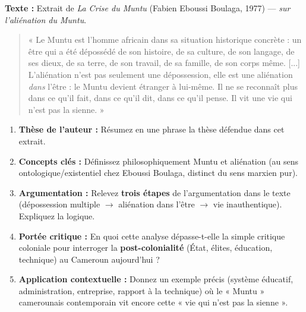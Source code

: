 \documentclass[11pt]{article}
\newcommand{\cle}[1]{{\popxbold\color{popdark}#1}}
\begin{document}
\begin{exercice}
\textbf{Texte :} Extrait de \emph{La Crise du Muntu} (Fabien Eboussi Boulaga, 1977) — \emph{sur l'aliénation du Muntu}.
\begin{quote}
« Le Muntu est l'homme africain dans sa situation historique concrète : un être qui a été dépossédé de son histoire, de sa culture, de son langage, de ses dieux, de sa terre, de son travail, de sa famille, de son corps même. [...] L'aliénation n'est pas seulement une dépossession, elle est une aliénation \emph{dans} l'être : le Muntu devient étranger à lui-même. Il ne se reconnaît plus dans ce qu'il fait, dans ce qu'il dit, dans ce qu'il pense. Il vit une vie qui n'est pas la sienne. »
\end{quote}

\begin{enumerate}
    \item \textbf{Thèse de l'auteur :} Résumez en une phrase la thèse défendue dans cet extrait.
    \item \textbf{Concepts clés :} Définissez philosophiquement \cle{Muntu} et \cle{aliénation} (au sens ontologique/existentiel chez Eboussi Boulaga, distinct du sens marxien pur).
    \item \textbf{Argumentation :} Relevez \textbf{trois étapes} de l'argumentation dans le texte (dépossession multiple $\rightarrow$ aliénation dans l'être $\rightarrow$ vie inauthentique). Expliquez la logique.
    \item \textbf{Portée critique :} En quoi cette analyse dépasse-t-elle la simple critique coloniale pour interroger la \textbf{post-colonialité} (État, élites, éducation, technique) au Cameroun aujourd'hui ?
    \item \textbf{Application contextuelle :} Donnez un exemple précis (système éducatif, administration, entreprise, rapport à la technique) où le « Muntu » camerounais contemporain vit encore cette « vie qui n'est pas la sienne ».
\end{enumerate}
\end{exercice}
\end{document}
